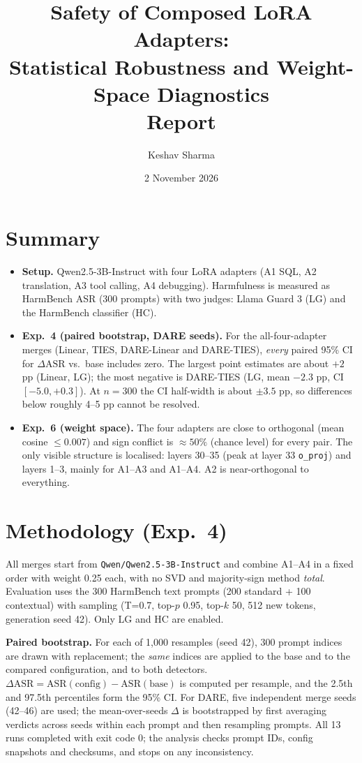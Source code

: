 \documentclass[10pt,a4paper]{article}
\title{Safety of Composed LoRA Adapters:\\ Statistical Robustness and Weight-Space Diagnostics\\[2pt]\large Report}
\author{Keshav Sharma}
\date{2 November 2026}
\newcommand{\asr}{\mathrm{ASR}}
\begin{document}
\maketitle

\section*{Summary}
\begin{itemize}
\item \textbf{Setup.} Qwen2.5-3B-Instruct with four LoRA adapters (A1 SQL, A2 translation, A3 tool calling, A4 debugging). Harmfulness is measured as HarmBench ASR (300 prompts) with two judges: Llama Guard 3 (LG) and the HarmBench classifier (HC).
\item \textbf{Exp.~4 (paired bootstrap, DARE seeds).} For the all-four-adapter merges (Linear, TIES, DARE-Linear and DARE-TIES), \emph{every} paired 95\% CI for $\Delta\asr$ vs.\ base includes zero. The largest point estimates are about $+2$ pp (Linear, LG); the most negative is DARE-TIES (LG, mean $-2.3$ pp, CI $[-5.0,+0.3]$). At $n=300$ the CI half-width is about $\pm3.5$ pp, so differences below roughly 4--5 pp cannot be resolved.
\item \textbf{Exp.~6 (weight space).} The four adapters are close to orthogonal (mean cosine $\le0.007$) and sign conflict is $\approx50\%$ (chance level) for every pair. The only visible structure is localised: layers 30--35 (peak at layer 33 \texttt{o\_proj}) and layers 1--3, mainly for A1--A3 and A1--A4. A2 is near-orthogonal to everything.
\end{itemize}

\section{Methodology (Exp.~4)}
All merges start from \texttt{Qwen/Qwen2.5-3B-Instruct} and combine A1--A4 in a fixed order with weight 0.25 each, with no SVD and majority-sign method \emph{total}. Evaluation uses the 300 HarmBench text prompts (200 standard + 100 contextual) with sampling (T=0.7, top-$p$ 0.95, top-$k$ 50, 512 new tokens, generation seed 42). Only LG and HC are enabled.

\textbf{Paired bootstrap.} For each of 1{,}000 resamples (seed 42), 300 prompt indices are drawn with replacement; the \emph{same} indices are applied to the base and to the compared configuration, and to both detectors. $\Delta\asr=\asr(\text{config})-\asr(\text{base})$ is computed per resample, and the 2.5th and 97.5th percentiles form the 95\% CI. For DARE, five independent merge seeds (42--46) are used; the mean-over-seeds $\Delta$ is bootstrapped by first averaging verdicts across seeds within each prompt and then resampling prompts. All 13 runs completed with exit code 0; the analysis checks prompt IDs, config snapshots and checksums, and stops on any inconsistency.
\end{document}
